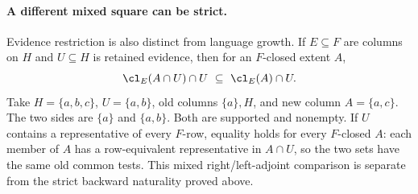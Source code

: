 \paragraph{A different mixed square can be strict.}
Evidence restriction is also distinct from language growth. If $E\subseteq F$
are columns on $H$ and $U\subseteq H$ is retained evidence, then for an
$F$-closed extent $A$,
\[
 \cl_E(A\cap U)\cap U\ \subseteq\ \cl_E(A)\cap U.
\]
Take $H=\{a,b,c\}$, $U=\{a,b\}$, old columns $\{a\},H$, and new
column $A=\{a,c\}$. The two sides are $\{a\}$ and $\{a,b\}$.
Both are supported and nonempty. If $U$ contains a representative of
every $F$-row, equality holds for every $F$-closed $A$: each member of
$A$ has a row-equivalent representative in $A\cap U$, so the two sets
have the same old common tests. This mixed right/left-adjoint comparison
is separate from the strict backward naturality proved above.
